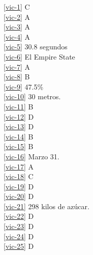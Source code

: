 \noindent \ref{vic-1} C\\
\ref{vic-2} A\\
\ref{vic-3} A\\
\ref{vic-4} A\\
\ref{vic-5} 30.8 segundos\\
\ref{vic-6} El Empire State\\
\ref{vic-7} A\\
\ref{vic-8} B\\
\ref{vic-9} 47.5\%\\
\ref{vic-10} 30 metros.\\
\ref{vic-11} B\\
\ref{vic-12} D\\
\ref{vic-13} D\\
\ref{vic-14} B\\
\ref{vic-15} B\\
\ref{vic-16} Marzo 31.\\
\ref{vic-17} A\\
\ref{vic-18} C\\
\ref{vic-19} D\\
\ref{vic-20} D\\
\ref{vic-21} 298 kilos de az\'ucar.\\
\ref{vic-22} D\\
\ref{vic-23} D\\
\ref{vic-24} D\\
\ref{vic-25} D\\